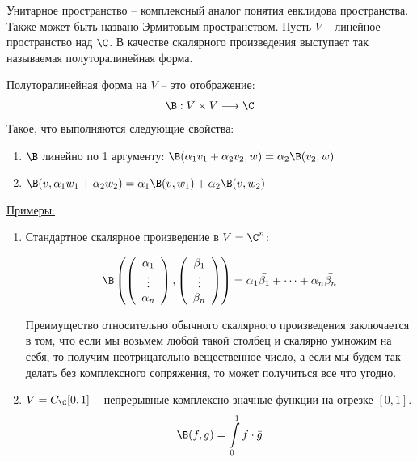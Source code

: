 Унитарное пространство -- комплексный аналог понятия евклидова пространства. Также может быть названо 
Эрмитовым пространством. Пусть $V$ -- линейное пространство над $\C$. В качестве скалярного произведения выступает так 
называемая полуторалинейная форма. 

\begin{conj}
    Полуторалинейная форма на $V$ -- это отображение: 
    \begin{gather*}
        \B: V \times V \longrightarrow \C
    \end{gather*}
    Такое, что выполняются следующие свойства: 
    \begin{enumerate}
        \item $\B$ линейно по 1 аргументу: $\B(\alpha_1 v_1 + \alpha_2 v_2, w) = \alpha_2 \B(v_2, w)$
        \item $\B(v, \alpha_1 w_1 + \alpha_2 w_2) = \bar{\alpha_1} \B(v, w_1) + \bar{\alpha_2}\B(v, w_2)$
    \end{enumerate}
    \underline{Примеры:}
    \begin{enumerate}
        \item Стандартное скалярное произведение в $V = \C^n$:
        
        \begin{gather*}
            \B\left(\left(\begin{array}{c}
            \alpha_1 \\ 
            \vdots \\ 
            \alpha_n
            \end{array}\right), 
            \left(\begin{array}{c}
            \beta_1 \\ 
            \vdots \\ 
            \beta_n
            \end{array}\right)\right) 
            = \alpha_1 \bar{\beta_1} + \dots + \alpha_n \bar{\beta_n}
        \end{gather*}

        Преимущество относительно обычного скалярного произведения заключается в том, что если мы возьмем любой такой столбец и
        скалярно умножим на себя, то получим неотрицательно вещественное число, а если мы будем так делать без комплексного 
        сопряжения, то может получиться все что угодно.

        \item $V = C_{\C} [0, 1]$ -- непрерывные комплексно-значные функции на отрезке $[0, 1]$.
        \begin{gather*}
            \B(f, g) = \int\limits_0^1 f \cdot \bar{g}
        \end{gather*}
    \end{enumerate}    
\end{conj}

